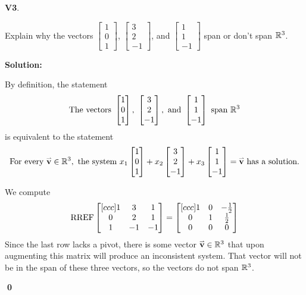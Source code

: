 \documentclass{article}
\newenvironment{problem}[1]
{
  \begin{flushleft}
  \textbf{#1}.
  \ignorespaces
}
{
  \end{flushleft}
}
\newenvironment{solution}
{
  \ignorespaces
  \textbf{Solution:}
}
{
  \ignorespacesafterend
  \begin{flushright}
  {\bfseries \qed}
  \end{flushright}
}
\begin{document}
\begin{problem}{V3}
Explain why the vectors
\(\begin{bmatrix} 1 \\ 0 \\ 1 \end{bmatrix} \),
\(\begin{bmatrix} 3 \\ 2 \\ -1 \end{bmatrix} \), and
\(\begin{bmatrix} 1 \\ 1 \\ -1 \end{bmatrix} \) span or don't span \(\mathbb{R}^3\).
\end{problem}
\begin{solution}
By definition, the statement
\[\text{The vectors }\begin{bmatrix} 1 \\ 0 \\ 1 \end{bmatrix} ,\ 
\begin{bmatrix} 3 \\ 2 \\ -1 \end{bmatrix}, \text{ and }
\begin{bmatrix} 1 \\ 1 \\ -1 \end{bmatrix}  \text{ span } \IR^3\]
is equivalent to the statement
\[\text{For every }\mathbf{\accentset{\rightharpoonup}{v}} \in \mathbb{R}^3,\text{ the system }
x_1\begin{bmatrix} 1 \\ 0 \\ 1 \end{bmatrix}+  
x_2 \begin{bmatrix} 3 \\ 2 \\ -1 \end{bmatrix}+
x_3\begin{bmatrix} 1 \\ 1 \\ -1 \end{bmatrix}=\mathbf{\accentset{\rightharpoonup}{v}}\text{ has a solution.}\]


We compute
\[ \operatorname{RREF}
  \begin{bmatrix}[ccc]
  1 & 3 & 1  \\
  0 & 2 & 1  \\
  1 & -1 & -1
  \end{bmatrix}
  =
  \begin{bmatrix}[ccc]
  1 & 0 & -\frac{1}{2} \\
  0 & 1 & \frac{1}{2} \\
  0 & 0 & 0
  \end{bmatrix}
\]
Since the last row lacks a pivot, there is some vector \(\mathbf{\accentset{\rightharpoonup}{v}} \in \mathbb{R}^3\) that upon augmenting this matrix will produce
an inconsistent system. That vector will not be in the span of these three vectors, so the vectors do not span \(\mathbb{R}^3\).
\end{solution}
\end{document}
